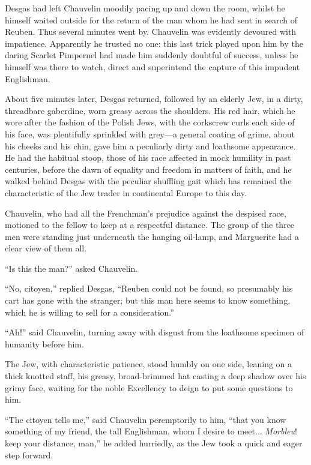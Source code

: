 \documentclass[paper=a5,BCOR=7mm,twoside,DIV=calc,12pt,usegeometry,chapterprefix,endperiod,headings=big]{scrbook}
\begin{document}
Desgas had left Chauvelin moodily pacing up and down the room, whilst he himself waited outside for the return of the man whom he had sent in search of Reuben. Thus several minutes went by. Chauvelin was evidently devoured with impatience. Apparently he trusted no one: this last trick played upon him by the daring Scarlet Pimpernel had made him suddenly doubtful of success, unless he himself was there to watch, direct and superintend the capture of this impudent Englishman.

About five minutes later, Desgas returned, followed by an elderly Jew, in a dirty, threadbare gaberdine, worn greasy across the shoulders. His red hair, which he wore after the fashion of the Polish Jews, with the corkscrew curls each side of his face, was plentifully sprinkled with grey---a general coating of grime, about his cheeks and his chin, gave him a peculiarly dirty and loathsome appearance. He had the habitual stoop, those of his race affected in mock humility in past centuries, before the dawn of equality and freedom in matters of faith, and he walked behind Desgas with the peculiar shuffling gait which has remained the characteristic of the Jew trader in continental Europe to this day.

Chauvelin, who had all the Frenchman's prejudice against the despised race, motioned to the fellow to keep at a respectful distance. The group of the three men were standing just underneath the hanging oil-lamp, and Marguerite had a clear view of them all.

\enquote{Is this the man?} asked Chauvelin.

\enquote{No, citoyen,} replied Desgas, \enquote{Reuben could not be found, so presumably his cart has gone with the stranger; but this man here seems to know something, which he is willing to sell for a consideration.}

\enquote{Ah!} said Chauvelin, turning away with disgust from the loathsome specimen of humanity before him.

The Jew, with characteristic patience, stood humbly on one side, leaning on a thick knotted staff, his greasy, broad-brimmed hat casting a deep shadow over his grimy face, waiting for the noble Excellency to deign to put some questions to him.

\enquote{The citoyen tells me,} said Chauvelin peremptorily to him, \enquote{that you know something of my friend, the tall Englishman, whom I desire to meet... \textit{Morbleu}! keep your distance, man,} he added hurriedly, as the Jew took a quick and eager step forward.
\end{document}

